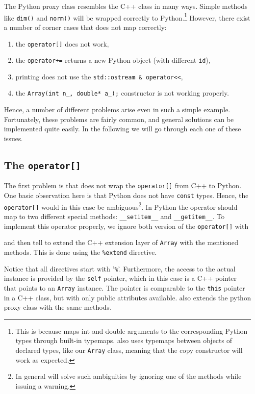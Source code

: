 The Python proxy class resembles the C++ class in many ways. Simple methods like \texttt{dim()} and \texttt{norm()} will be wrapped correctly to Python.\footnote{This is because \swig maps int and double arguments to the corresponding Python types through built-in typemaps. \swig also uses typemaps between objects of declared types, like our \texttt{Array} class, meaning that the copy constructor will work as expected.} However, there exist a number of corner cases that \swig does not map correctly:
\begin{enumerate}
\item the \texttt{operator[]} does not work,
\item the \texttt{operator+=} returns a new Python object (with different \texttt{id}),
\item printing does not use the \texttt{std::ostream \& operator<<},%
\item the \texttt{Array(int n\_, double* a\_);} constructor is not working properly.%
\end{enumerate}
Hence, a number of different problems arise even in such a simple example. Fortunately, these problems are fairly common, and general solutions can be implemented quite easily. In the following we will go through each one of these issues.\par

\subsection{The \texttt{operator[]}}
The first problem is that \swig does not wrap the \texttt{operator[]} from C++ to Python.
One basic observation here is that Python does not have \texttt{const} types. Hence,
the \texttt{operator[]} would in this case be ambiguous\footnote{In general will \swig solve such ambiguities by ignoring one of the methods while issuing a warning.}.
In Python the operator should map to two different special methods: \texttt{\_\_setitem\_\_} and \texttt{\_\_getitem\_\_}. To implement this operator properly, we ignore both version of the \texttt{operator[]} with
\begin{c++}
\end{c++}
and then tell \swig to extend the C++ extension layer of \texttt{Array} with the mentioned methods. This is done using the \texttt{\%extend} directive.
Notice that all \swig directives start with '\texttt{\%}'.
Furthermore, the access to the actual instance is provided by the \texttt{self} pointer, which in this case is a C++ pointer that points to an \texttt{Array} instance. The pointer is comparable to the \texttt{this} pointer in a C++ class, but with only public attributes available. \swig also extends the python proxy class with the same methods.\par

